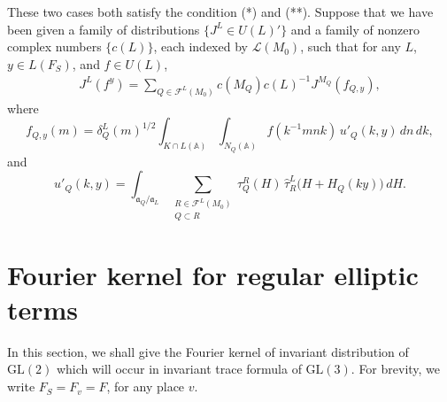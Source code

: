 \documentclass[11pt]{amsart}
\newcommand{\GGL}{\mathrm{GL}}
\theoremstyle{definition}
\numberwithin{equation}{section}
\begin{document}
    
	These two cases both satisfy the condition (*) and (**). Suppose that we have been given a family of distributions 
	\(\{J^L \in U(L)'\}\) and a family of nonzero complex numbers \(\{c(L)\}\), each indexed by 
	\(\mathcal{L}(M_0)\), such that for any \(L\), \(y \in L(F_S)\), and \(f \in U(L)\),
	\begin{align}\label{***}
		J^L(f^y) = \sum_{Q \in \mathcal{F}^L(M_0)} c(M_Q)c(L)^{-1} J^{M_Q}(f_{Q,y}),
	\end{align}where
	\[
	f_{Q,y}(m)
	=
	\delta_Q^L(m)^{1/2}
	\int_{K\cap L(\mathbb A)}
	\int_{N_Q(\mathbb A)}
	f(k^{-1}mnk)\,
	u'_Q(k,y)\,dn\,dk ,
	\]and \[
	u'_Q(k,y)
	=
	\int_{\mathfrak a_Q/\mathfrak a_L}
	\sum_{\substack{
			R\in\mathcal F^L(M_0)\\
			Q\subset R
	}}
	\tau_Q^R(H)\,
	\widehat{\tau}_R^L
	\bigl(H+H_Q(ky)\bigr)\,dH .
	\]
	
	\section{Fourier kernel for regular elliptic terms}
	In this section, we shall give the Fourier kernel of invariant distribution of \(\GGL(2)\) which will occur in invariant trace formula of $\GGL(3)$. For brevity, we write \(F_S=F_v=F\), for any place \(v\).
	
\end{document}
